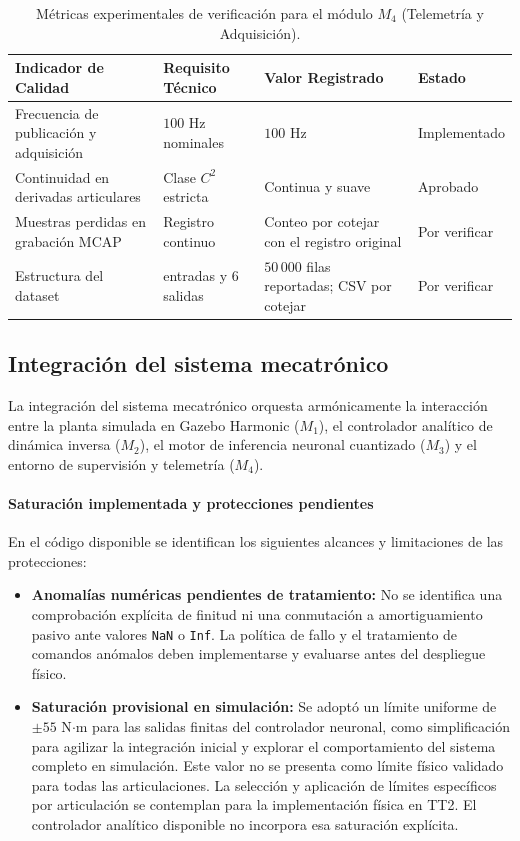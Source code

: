 \documentclass[12pt]{article}
\begin{document}
\begin{table}[htbp]
\centering
\small
\caption{Métricas experimentales de verificación para el módulo $M_4$ (Telemetría y Adquisición).}
\label{tab:verificacion_m4}
\begin{tabularx}{\textwidth}{>{\raggedright\arraybackslash}X >{\centering\arraybackslash}p{3.8cm} >{\centering\arraybackslash}p{3.6cm} >{\centering\arraybackslash}p{2.0cm}}
\toprule
\textbf{Indicador de Calidad} & \textbf{Requisito Técnico} & \textbf{Valor Registrado} & \textbf{Estado} \\
\midrule
Frecuencia de publicación y adquisición & $100\text{ Hz}$ nominales & $100\text{ Hz}$ & Implementado \\
Continuidad en derivadas articulares & Clase $C^2$ estricta & Continua y suave & Aprobado \\
Muestras perdidas en grabación MCAP & Registro continuo & Conteo por cotejar con el registro original & Por verificar \\
Estructura del dataset & 42 entradas y 6 salidas & $50\,000$ filas reportadas; CSV por cotejar & Por verificar \\
\bottomrule
\end{tabularx}
\end{table}


\subsection{Integración del sistema mecatrónico}
\label{sec:imp_integracion}

La integración del sistema mecatrónico orquesta armónicamente la interacción entre la planta simulada en Gazebo Harmonic ($M_1$), el controlador analítico de dinámica inversa ($M_2$), el motor de inferencia neuronal cuantizado ($M_3$) y el entorno de supervisión y telemetría ($M_4$).

\paragraph{Saturación implementada y protecciones pendientes}
En el código disponible se identifican los siguientes alcances y limitaciones de las protecciones:
\begin{itemize}
    \item \textbf{Anomalías numéricas pendientes de tratamiento:} No se identifica una comprobación explícita de finitud ni una conmutación a amortiguamiento pasivo ante valores \texttt{NaN} o \texttt{Inf}. La política de fallo y el tratamiento de comandos anómalos deben implementarse y evaluarse antes del despliegue físico.
    \item \textbf{Saturación provisional en simulación:} Se adoptó un límite uniforme de $\pm55$ N$\cdot$m para las salidas finitas del controlador neuronal, como simplificación para agilizar la integración inicial y explorar el comportamiento del sistema completo en simulación. Este valor no se presenta como límite físico validado para todas las articulaciones. La selección y aplicación de límites específicos por articulación se contemplan para la implementación física en TT2. El controlador analítico disponible no incorpora esa saturación explícita.
\end{itemize}
\end{document}
